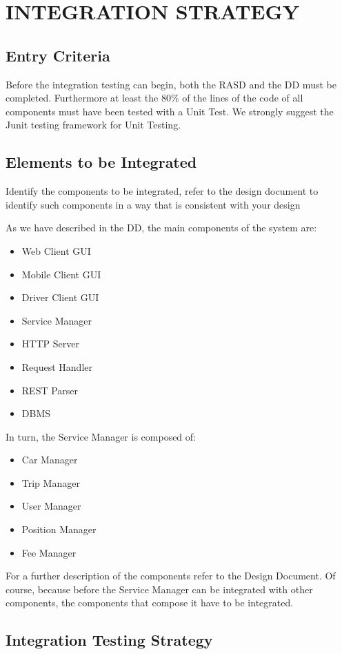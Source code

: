 \section{INTEGRATION STRATEGY}
\subsection{Entry Criteria} 
Before the integration testing can begin, both the RASD and the DD must be completed. Furthermore at least the 80\% of the lines of the code of all components must have been tested with a Unit Test. We strongly suggest the Junit testing framework for Unit Testing.
\subsection{Elements to be Integrated} Identify the components to be integrated, refer to the design document to identify such components in a way that is consistent with your design
\newline 

As we have described in the DD, the main components of the system are:
\begin{itemize}
\item Web Client GUI
\item Mobile Client GUI
\item Driver Client GUI
\item Service Manager 
\item HTTP Server
\item Request Handler
\item REST Parser
\item DBMS
\end{itemize}

In turn, the Service Manager is composed of:
\begin{itemize}
\item Car Manager
\item Trip Manager
\item User Manager
\item Position Manager
\item Fee Manager
\end{itemize}
\noindent
For a further description of the components refer to the Design Document. 
\newline 
Of course, because before the Service Manager can be integrated with other components, the components that compose it have to be integrated.


\subsection{Integration Testing Strategy} 

